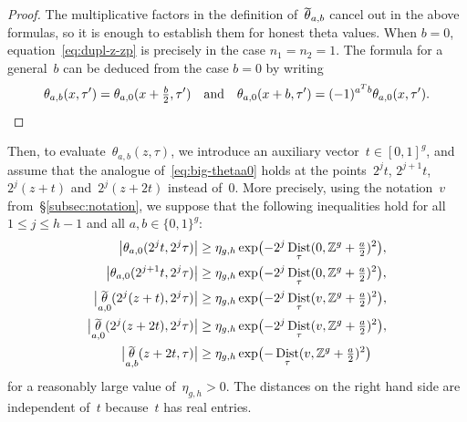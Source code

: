 \documentclass[12pt,oneside]{amsart}
\numberwithin{equation}{section}
\theoremstyle{definition}
\newcommand{\Z}{\mathbb{Z}}
\DeclareMathOperator{\Dist}{Dist}
\DeclareMathOperator{\thetatilde}{\rlap{\raisebox{-0.1ex}{$\widetilde{\phantom{\,t}}$}}\theta}
\DeclarePairedDelimiter{\abs}{|}{|}
\DeclarePairedDelimiter{\paren}{(}{)}
\begin{document}
\begin{proof}
  The multiplicative factors in the definition of~$\thetatilde_{a,b}$ cancel
  out in the above formulas, so it is enough to establish them for honest theta
  values. When $b=0$, equation~\eqref{eq:dupl-z-zp} is precisely
  \cite[Prop.~6.4 p.\,221]{mumfordTataLecturesTheta1983} in the case
  $n_1=n_2=1$. The formula for a general~$b$ can be deduced from the case $b=0$
  by writing
  \begin{displaymath}
    \theta_{a,b}(x,\tau') = \theta_{a,0}(x + \tfrac b2,\tau') \quad\text{and}\quad
    \theta_{a,0}(x + b,\tau') = (-1)^{a^T b} \theta_{a,0}(x,\tau'). \qedhere
  \end{displaymath}
\end{proof}

Then, to evaluate~$\theta_{a,b}(z,\tau)$, we introduce an auxiliary
vector~$t\in [0,1]^g$, and assume that the analogue of~\eqref{eq:big-thetaa0}
holds at the points~$2^j t$, $2^{j+1}t$, $2^j(z + t)$ and~$2^j(z + 2t)$ instead
of~$0$. More precisely, using the notation~$v$ from~§\ref{subsec:notation}, we
suppose that the following inequalities hold for all $1\leq j\leq h-1$ and all
$a,b\in \{0,1\}^g$:
\begin{equation}
  \label{eq:big-thetaa0-gen}
  \begin{aligned}
    \abs[\big]{\theta_{a,0}(2^j t,2^j{\tau})} &\geq \eta_{g,h} \exp\paren[\big]{-2^j \Dist_{\tau}(0, \Z^g + \tfrac a2)^2},\\
    \abs[\big]{\theta_{a,0}(2^{j+1}t ,2^j{\tau})} &\geq \eta_{g,h} \exp\paren[\big]{-2^j \Dist_{\tau}(0, \Z^g + \tfrac a2)^2},\\
    \abs[\big]{\thetatilde_{a,0}(2^j(z + t),2^j{\tau})} &\geq \eta_{g,h} \exp\paren[\big]{-2^j \Dist_{\tau}(v, \Z^g + \tfrac a2)^2},\\
    \abs[\big]{\thetatilde_{a,0}(2^j(z + 2t),2^j{\tau})} &\geq \eta_{g,h} \exp\paren[\big]{-2^j \Dist_{\tau}(v, \Z^g + \tfrac a2)^2},\\
    \abs[\big]{\thetatilde_{a,b}(z + 2t, {\tau})} &\geq \eta_{g,h} \exp\paren[\big]{- \Dist_{\tau}(v, \Z^g + \tfrac a2)^2}\\
  \end{aligned}
\end{equation}
for a reasonably large value of~$\eta_{g,h}>0$. The distances on the right hand
side are independent of~$t$ because~$t$ has real entries.
\end{document}
